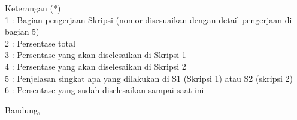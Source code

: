\documentclass[a4paper,twoside]{article}
\begin{document}
Keterangan (*)\\
1 : Bagian pengerjaan Skripsi (nomor disesuaikan dengan detail pengerjaan di bagian 5)\\
2 : Persentase total \\
3 : Persentase yang akan diselesaikan di Skripsi 1 \\
4 : Persentase yang akan diselesaikan di Skripsi 2 \\
5 : Penjelasan singkat apa yang dilakukan di S1 (Skripsi 1) atau S2 (skripsi 2)\\
6 : Persentase yang sudah diselesaikan sampai saat ini 


\vspace{1cm}
\centering Bandung, \tanggal\\
\vspace{2cm} \nama \\ 
\vspace{1cm}
\end{document}

